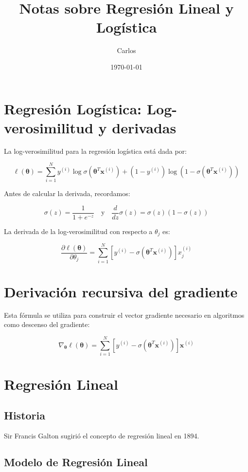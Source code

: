\documentclass[12pt]{article}
\title{Notas sobre Regresión Lineal y Logística}
\author{Carlos}
\date{\today}
\begin{document}
\maketitle

\tableofcontents
\newpage

\section{Regresión Logística: Log-verosimilitud y derivadas}

La log-verosimilitud para la regresión logística está dada por:

\[
\ell(\bm{\theta}) = \sum_{i=1}^N y^{(i)} \log \sigma(\bm{\theta}^T \bm{x}^{(i)}) + (1 - y^{(i)}) \log(1 - \sigma(\bm{\theta}^T \bm{x}^{(i)}))
\]

Antes de calcular la derivada, recordamos:

\[
\sigma(z) = \frac{1}{1 + e^{-z}} \quad \text{y} \quad \frac{d}{dz} \sigma(z) = \sigma(z)(1 - \sigma(z))
\]

La derivada de la log-verosimilitud con respecto a $\theta_j$ es:

\[
\frac{\partial \ell(\bm{\theta})}{\partial \theta_j} = \sum_{i=1}^N \left[y^{(i)} - \sigma(\bm{\theta}^T \bm{x}^{(i)}) \right] x_j^{(i)}
\]

\section{Derivación recursiva del gradiente}

Esta fórmula se utiliza para construir el vector gradiente necesario en algoritmos como descenso del gradiente:

\[
\nabla_{\bm{\theta}} \ell(\bm{\theta}) = \sum_{i=1}^N \left[y^{(i)} - \sigma(\bm{\theta}^T \bm{x}^{(i)})\right] \bm{x}^{(i)}
\]

\section{Regresión Lineal}

\subsection{Historia}

Sir Francis Galton sugirió el concepto de regresión lineal en 1894.

\subsection{Modelo de Regresión Lineal}
\end{document}
